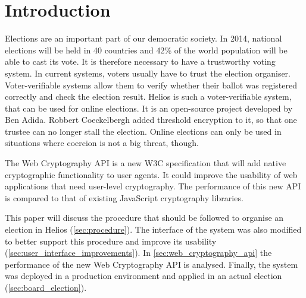 % 
%

\section{Introduction}

Elections are an important part of our democratic society. In 2014, national elections will be held in 40 countries and 42\% of the world population will be able to cast its vote.\cite{news:economist_2014_ballot_boxes} It is therefore necessary to have a trustworthy voting system. In current systems, voters usually have to trust the election organiser. Voter-verifiable systems allow them to verify whether their ballot was registered correctly and check the election result. Helios is such a voter-verifiable system, that can be used for online elections. It is an open-source project developed by Ben Adida.\cite{site:adida_helios_documentation} Robbert Coeckelbergh added threshold encryption to it, so that one trustee can no longer stall the election.\cite{coeckelbergh_application_and_extension_of_the_helios_voting_system} Online elections can only be used in situations where coercion is not a big threat, though. 

\par The Web Cryptography API is a new W3C specification that will add native cryptographic functionality to user agents.\cite{sleevi_watson_web_cryptography_api} It could improve the usability of web applications that need user-level cryptography. The performance of this new API is compared to that of existing JavaScript cryptography libraries.

\par This paper will discuss the procedure that should be followed to organise an election in Helios (\ref{sec:procedure}). The interface of the system was also modified to better support this procedure and improve its usability (\ref{sec:user_interface_improvements}). In \ref{sec:web_cryptography_api} the performance of the new Web Cryptography API is analysed. Finally, the system was deployed in a production environment and applied in an actual election (\ref{sec:board_election}).